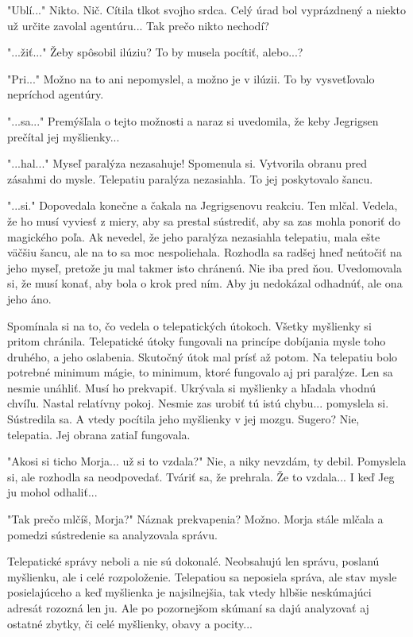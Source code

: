 \documentclass{book}
\begin{document}
"$ $Ublí..."$ $ Nikto. Nič. Cítila tlkot svojho srdca. Celý úrad bol vyprázdnený a niekto už určite zavolal agentúru... Tak prečo nikto nechodí?

"$ $...žiť..."$ $ Žeby spôsobil ilúziu? To by musela pocítiť, alebo...?

"$ $Pri..."$ $ Možno na to ani nepomyslel, a možno je v ilúzii. To by vysvetľovalo nepríchod agentúry.

"$ $...sa..."$ $ Premýšľala o tejto možnosti a naraz si uvedomila, že keby Jegrigsen prečítal jej myšlienky...

"$ $...hal..."$ $ Myseľ paralýza nezasahuje! Spomenula si. Vytvorila obranu pred zásahmi do mysle. Telepatiu paralýza nezasiahla. To jej poskytovalo šancu.

"$ $...si."$ $ Dopovedala konečne a čakala na Jegrigsenovu reakciu. Ten mlčal. Vedela, že ho musí vyviesť z miery, aby sa prestal sústrediť, aby sa zas mohla ponoriť do magického poľa. Ak nevedel, že jeho paralýza nezasiahla telepatiu, mala ešte väčšiu šancu, ale na to sa moc nespoliehala. Rozhodla sa radšej hneď neútočiť na jeho myseľ, pretože ju mal takmer isto chránenú. Nie iba pred ňou. Uvedomovala si, že musí konať, aby bola o krok pred ním. Aby ju nedokázal odhadnúť, ale ona jeho áno.

Spomínala si na to, čo vedela o telepatických útokoch. Všetky myšlienky si pritom chránila. Telepatické útoky fungovali na princípe dobíjania mysle toho druhého, a jeho oslabenia. Skutočný útok mal prísť až potom. Na telepatiu bolo potrebné minimum mágie, to minimum, ktoré fungovalo aj pri paralýze. Len sa nesmie unáhliť. Musí ho prekvapiť. Ukrývala si myšlienky a hľadala vhodnú chvíľu. Nastal relatívny pokoj. Nesmie zas urobiť tú istú chybu... pomyslela si. Sústredila sa. A vtedy pocítila jeho myšlienky v jej mozgu. Sugero? Nie, telepatia. Jej obrana zatiaľ fungovala.

"$ $Akosi si ticho Morja... už si to vzdala?"$ $ Nie, a niky nevzdám, ty debil. Pomyslela si, ale rozhodla sa neodpovedať. Tváriť sa, že prehrala. Že to vzdala... I keď Jeg ju mohol odhaliť...

"$ $Tak prečo mlčíš, Morja?"$ $ Náznak prekvapenia? Možno. Morja stále mlčala a pomedzi sústredenie sa analyzovala správu.

Telepatické správy neboli a nie sú dokonalé. Neobsahujú len správu, poslanú myšlienku, ale i celé rozpoloženie. Telepatiou sa neposiela správa, ale stav mysle posielajúceho a keď myšlienka je najsilnejšia, tak vtedy hlbšie neskúmajúci adresát rozozná len ju. Ale po pozornejšom skúmaní sa dajú analyzovať aj ostatné zbytky, či celé myšlienky, obavy a pocity...
\end{document}
